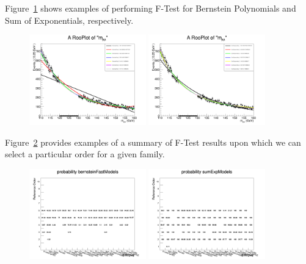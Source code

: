 Figure~\ref{bkgmodel:exampleFTest} shows examples of performing F-Test for Bernstein Polynomials and Sum of Exponentials, respectively.

\begin{figure}[hbp]
     \centering
     \includegraphics[width=0.45\textwidth]{figures/background_model/baseline_ftest_p25GeV_110to160/ftest__01JetsTightBB__bernsteinFastModels.png}
     \includegraphics[width=0.45\textwidth]{figures/background_model/baseline_ftest_p25GeV_110to160/ftest__01JetsTightBB__sumExpModels.png}
     \caption{}
     \label{bkgmodel:exampleFTest}
 \end{figure}

 Figure~\ref{bkgmodel:exampleFTestResults} provides examples of a summary of F-Test results upon which we can select a particular order for a given family.

 \begin{figure}[hbp]
     \centering
     \includegraphics[width=0.45\textwidth]{figures/background_model/baseline_ftest_p25GeV_110to160/ftestresults__probability__bernsteinFastModels.png}
     \includegraphics[width=0.45\textwidth]{figures/background_model/baseline_ftest_p25GeV_110to160/ftestresults__probability__sumExpModels.png}
     \caption{}
     \label{bkgmodel:exampleFTestResults}
 \end{figure}
